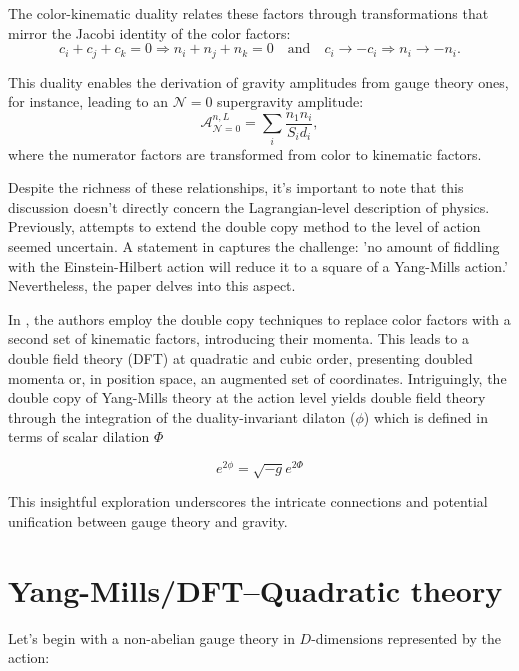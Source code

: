 \documentclass[13pt]{article}
\begin{document}
The color-kinematic duality relates these factors through transformations that mirror the Jacobi identity of the color factors:
\begin{equation}
c_i + c_j + c_k = 0 \Rightarrow n_i + n_j + n_k = 0 \quad \text{and} \quad c_i \rightarrow -c_i \Rightarrow n_i \rightarrow -n_i. \tag{3}
\end{equation}

This duality enables the derivation of gravity amplitudes from gauge theory ones, for instance, leading to an $\mathcal{N} = 0$ supergravity amplitude:
\begin{equation}
\mathcal{A}_{\mathcal{N}=0}^{n,L} = \sum_i \frac{n_1 n_i}{S_i d_i}, \tag{4}
\end{equation}
where the numerator factors are transformed from color to kinematic factors.

Despite the richness of these relationships, it's important to note that this discussion doesn't directly concern the Lagrangian-level description of physics. Previously, attempts to extend the double copy method to the level of action seemed uncertain. A statement in \cite{Grassmann} captures the challenge: 'no amount of fiddling with the Einstein-Hilbert action will reduce it to a square of a Yang-Mills action.' Nevertheless, the paper \cite{D_az_Jaramillo_2022} delves into this aspect.

In \cite{D_az_Jaramillo_2022}, the authors employ the double copy techniques to replace color factors with a second set of kinematic factors, introducing their momenta. This leads to a double field theory (DFT) at quadratic and cubic order, presenting doubled momenta or, in position space, an augmented set of coordinates. Intriguingly, the double copy of Yang-Mills theory at the action level yields double field theory through the integration of the duality-invariant dilaton ($\phi$) which is defined in terms of scalar dilation $\Phi$ \cite{D_az_Jaramillo_2022}

$$e^{2\phi}=\sqrt{-g}e^{2\Phi}$$

This insightful exploration underscores the intricate connections and potential unification between gauge theory and gravity.

\section{ Yang-Mills/DFT–Quadratic theory}

Let's begin with a non-abelian gauge theory in \(D\)-dimensions represented by the action:
\end{document}
